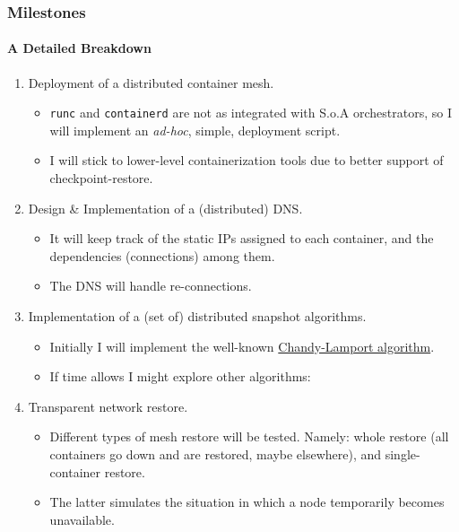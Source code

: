 \documentclass[9pt,    %
    english,            %
    xcolor=table,       %
    envcountsect,        %
    aspectratio=169     %
]{beamer}
\begin{document}
\begin{frame}
    \frametitle{Milestones}
    \framesubtitle{A Detailed Breakdown}
    
    \vspace{-15pt}

        \begin{enumerate}
            \item Deployment of a distributed container mesh.
            \begin{itemize}
                \item \texttt{runc} and \texttt{containerd} are not as integrated with S.o.A orchestrators, so I will implement an \textit{ad-hoc}, simple, deployment script.
                \item I will stick to lower-level containerization tools due to better support of checkpoint-restore.
            \end{itemize}
            \item Design \& Implementation of a (distributed) DNS.
            \begin{itemize}
                \item It will keep track of the static IPs assigned to each container, and the dependencies (connections) among them.
                \item The DNS will handle re-connections.
            \end{itemize}
            \item Implementation of a (set of) distributed snapshot algorithms.
            \begin{itemize}
                \item Initially I will implement the well-known \href{https://en.wikipedia.org/wiki/Chandy-Lamport_algorithm}{Chandy-Lamport algorithm}.
                \item If time allows I might explore other algorithms: 
            \end{itemize}
            \item Transparent network restore.
            \begin{itemize}
                \item Different types of mesh restore will be tested. Namely: whole restore (all containers go down and are restored, maybe elsewhere), and single-container restore.
                \item The latter simulates the situation in which a node temporarily becomes unavailable.
            \end{itemize}
        \end{enumerate}

\end{frame}
\end{document}
